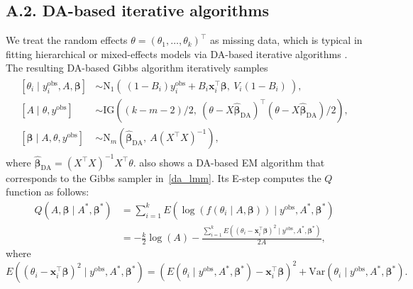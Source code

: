 \documentclass[12pt]{article}
\begin{document}
\begin{appendix}

\subsection{A.2. DA-based iterative algorithms}\label{app212}


We treat the random effects $\theta=(\theta_1, \ldots, \theta_k)^\top$ as missing data, which is typical in fitting hierarchical or mixed-effects models via DA-based iterative algorithms \citep{van2000mixed}. The resulting DA-based Gibbs algorithm  iteratively samples
\begin{align}
\begin{aligned}\label{da_lmm}
[\theta_i\mid y^{\textrm{obs}}_i, A, \boldsymbol{\beta}] &\sim \textrm{N}_1\!\left(~(1-B_i) y^{\textrm{obs}}_i+B_i\boldsymbol{x}^\top_i\boldsymbol{\beta},~ V_i(1-B_i)~\right),\\
[A\mid \theta, y^{\textrm{obs}}] & \sim \textrm{IG}\!\left((k-m-2)/2,~ (\theta-X\hat{\boldsymbol{\beta}}_{\textrm{DA}})^\top(\theta-X\hat{\boldsymbol{\beta}}_{\textrm{DA}})/2\right), \\
[\boldsymbol{\beta}\mid A, \theta, y^{\textrm{obs}}] &\sim \textrm{N}_m\!\left(\hat{\boldsymbol{\beta}}_{\textrm{DA}},~ A(X^\top X)^{-1}\right),
\end{aligned}
\end{align}
where $\hat{\boldsymbol{\beta}}_{\textrm{DA}}=(X^\top X)^{-1}X^\top \theta$. \citet{kelly2014advances} also shows a DA-based EM algorithm that corresponds to the Gibbs sampler in~\eqref{da_lmm}. Its E-step computes the $Q$ function as follows:
\begin{align}\nonumber
Q(A, \boldsymbol{\beta}\mid A^\ast, \boldsymbol{\beta}^\ast)&=\sum_{i=1}^kE(\log(f(\theta_i\mid A, \boldsymbol{\beta}))\mid y^{\textrm{obs}}, A^\ast, \boldsymbol{\beta}^\ast)\nonumber\\
&=-\frac{k}{2}\log(A)-\frac{\sum_{i=1}^kE\left( (\theta_i-\boldsymbol{x}^\top_i\boldsymbol{\beta})^2\mid y^{\textrm{obs}}, A^\ast, \boldsymbol{\beta}^\ast\right)}{2A}\nonumber,
\end{align}
where
\begin{equation}\label{da_em2}
E\left( (\theta_i-\boldsymbol{x}^\top_i\boldsymbol{\beta})^2\mid y^{\textrm{obs}}, A^\ast, \boldsymbol{\beta}^\ast\right)=\left( E(\theta_i\mid y^{\textrm{obs}}, A^\ast, \boldsymbol{\beta}^\ast)-\boldsymbol{x}^\top_i\boldsymbol{\beta}\right)^2+\textrm{Var}(\theta_i\mid y^{\textrm{obs}}, A^\ast, \boldsymbol{\beta}^\ast).

\end{equation}
\end{appendix}
\end{document}

